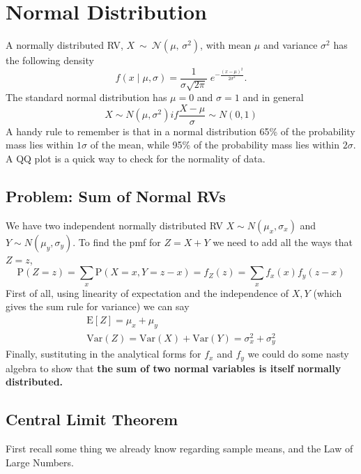 \section{Normal Distribution}
A normally distributed RV, $X\ \sim\ \mathcal{N}(\mu,\,\sigma^2)$, with mean $\mu$ and variance $\sigma^2$ has the following density
\begin{equation}
f(x \; | \; \mu, \sigma) = \frac{1}{\sigma\sqrt{2\pi} } \; e^{ -\frac{(x-\mu)^2}{2\sigma^2} }.
\end{equation}
The standard normal distribution has $\mu = 0$ and $\sigma = 1$ and in general 
\begin{equation}
X\sim N(\mu,\sigma^2) if \frac{X-\mu}{\sigma} \sim N(0,1)
\end{equation}
A handy rule to remember is that in a normal distribution 65\% of the probability mass lies within $1\sigma$ of the mean, while 95\% of the probability mass lies within $2\sigma$. A QQ plot is a quick way to check for the normality of data. 





\subsection{Problem: Sum of Normal RVs}
We have two independent normally distributed RV $X \sim N(\mu_x, \sigma_x)$ and $Y \sim N(\mu_y, \sigma_y)$. To find the pmf for $Z = X+Y$ we need to add all the ways that $Z=z$,
\begin{equation}
\mathrm{P}(Z=z) = \sum_x\mathrm{P}(X=x, Y=z-x) = f_Z(z) = \sum_xf_x(x)f_y(z-x)
\end{equation}
First of all, using linearity of expectation and the independence of $X, Y$ (which gives the sum rule for variance) we can say
\begin{align}
\mathrm{E}[Z] = \mu_x + \mu_y\\
\mathrm{Var}(Z) = \mathrm{Var}(X) + \mathrm{Var}(Y) = \sigma_x^2 + \sigma_y^2
\end{align}
Finally, sustituting in the analytical forms for $f_x$ and $f_y$ we could do some nasty algebra to show that \textbf{the sum of two normal variables is itself normally distributed.}



\subsection{Central Limit Theorem}
First recall some thing we already know regarding sample means, and the Law of Large Numbers. \n


